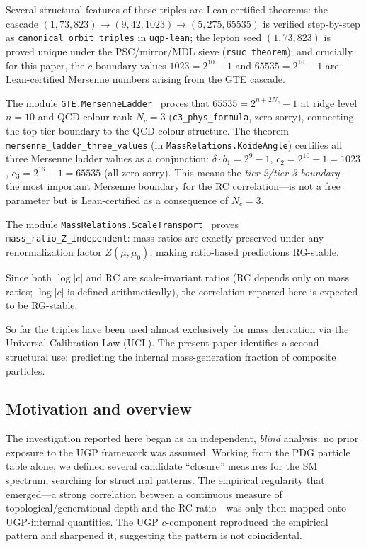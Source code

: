 \documentclass[12pt,a4paper]{article}
\newcommand{\RC}{\ensuremath{\mathrm{RC}}}
\begin{document}
Several structural features of these triples are Lean-certified theorems:
the cascade $(1,73,823) \to (9,42,1023) \to (5,275,65535)$ is verified
step-by-step as \texttt{canonical\_orbit\_triples} in \texttt{ugp-lean};
the lepton seed $(1,73,823)$ is proved unique under the PSC/mirror/MDL sieve
(\texttt{rsuc\_theorem}); and crucially for this paper, the $c$-boundary values
$1023 = 2^{10}-1$ and $65535 = 2^{16}-1$ are Lean-certified Mersenne numbers
arising from the GTE cascade.

The module \texttt{GTE.MersenneLadder}~\cite{ugp-lean} proves that
$65535 = 2^{n + 2N_c} - 1$ at ridge level $n=10$ and QCD colour rank $N_c=3$
(\texttt{c3\_phys\_formula}, zero sorry), connecting the top-tier boundary
to the QCD colour structure.
The theorem \texttt{mersenne\_ladder\_three\_values} (in
\texttt{MassRelations.KoideAngle}) certifies all three Mersenne ladder values
as a conjunction:
$\delta \cdot b_1 = 2^9 - 1$, $c_2 = 2^{10}-1 = 1023$,
$c_3 = 2^{16}-1 = 65535$ (all zero sorry).
This means the \emph{tier-2/tier-3 boundary}---the most important Mersenne
boundary for the RC correlation---is not a free parameter but is
Lean-certified as a consequence of $N_c = 3$.

{\sloppy The module \texttt{MassRelations.ScaleTransport}~\cite{ugp-lean} proves
\texttt{mass\_ratio\_Z\_independent}: mass ratios are exactly preserved
under any renormalization factor $Z(\mu,\mu_0)$, making ratio-based
predictions RG-stable.\par}
Since both $\log|c|$ and $\RC$ are scale-invariant ratios
(RC depends only on mass ratios; $\log|c|$ is defined arithmetically),
the correlation reported here is expected to be RG-stable.

So far the triples have been used almost exclusively for mass derivation
via the Universal Calibration Law (UCL).
The present paper identifies a second structural use: predicting the
internal mass-generation fraction of composite particles.

\FloatBarrier
\subsection{Motivation and overview}

The investigation reported here began as an independent, \emph{blind}
analysis: no prior exposure to the UGP framework was assumed.
Working from the PDG particle table alone, we defined several candidate
``closure'' measures for the SM spectrum, searching for structural patterns.
The empirical regularity that emerged---a strong correlation between a
continuous measure of topological/generational depth and the RC ratio---was
only then mapped onto UGP-internal quantities.
The UGP $c$-component reproduced the empirical pattern and sharpened it,
suggesting the pattern is not coincidental.
\end{document}
